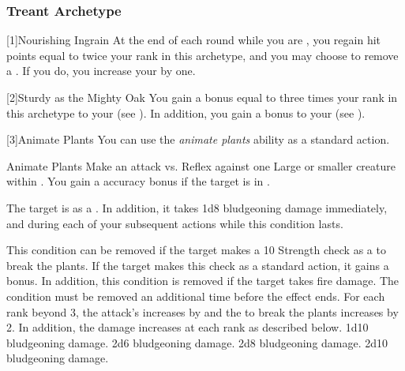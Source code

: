         \subsubsection{Treant Archetype}

            [1]{Nourishing Ingrain} At the end of each round while you are , you regain hit points equal to twice your rank in this archetype, and you may choose to remove a .
            If you do, you increase your  by one.

            [2]{Sturdy as the Mighty Oak} You gain a bonus equal to three times your rank in this archetype to your  (see ).
            In addition, you gain a  bonus to your  (see ).

            [3]{Animate Plants} You can use the \textit{animate plants} ability as a standard action.
            \begin{activeability}{Animate Plants}
                \rankline
                Make an attack vs. Reflex against one Large or smaller  creature within \medrange.
                You gain a  accuracy bonus if the target is in .

                \hit The target is \slowed as a .
                In addition, it takes 1d8 bludgeoning damage immediately, and during each of your subsequent actions while this condition lasts.

                This condition can be removed if the target makes a  10 Strength check as a  to break the plants.
                If the target makes this check as a standard action, it gains a  bonus.
                In addition, this condition is removed if the target takes fire damage.
                \crit The condition must be removed an additional time before the effect ends.
                \rankline
                For each rank beyond 3, the attack's  increases by  and the  to break the plants increases by 2.
                In addition, the damage increases at each rank as described below.
                 1d10 bludgeoning damage.
                 2d6 bludgeoning damage.
                 2d8 bludgeoning damage.
                 2d10 bludgeoning damage.
            \end{activeability}

